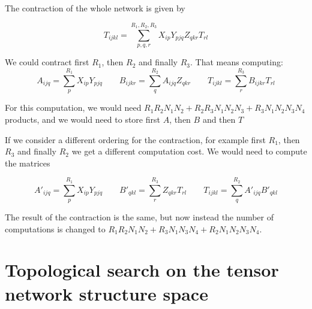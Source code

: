 \documentclass[11pt,a4paper,openright,oneside]{book}
\numberwithin{equation}{section}
\begin{document}
\begin{center}
\end{center}

The contraction of the whole network is given by

$$T_{ijkl} = \sum_{p,q,r}^{R_1, R_2, R_3} X_{ip} Y_{pjq} Z_{qkr} T_{rl}$$

We could contract first $R_1$, then $R_2$ and finally $R_3$. That means computing:
$$A_{ijq} = \sum_{p}^{R_1} X_{ip} Y_{pjq} \qquad B_{ijkr} = \sum_{q}^{R_2} A_{ijq} Z_{qkr} \qquad T_{ijkl} = \sum_{r}^{R_3} B_{ijkr} T_{rl}$$

For this computation, we would need $R_1 R_2 N_1 N_2 + R_2 R_3 N_1 N_2 N_3 + R_3 N_1 N_2 N_3 N_4$ products, and we would need to store
first $A$, then $B$ and then $T$

If we consider a different ordering for the contraction, for example first $R_1$, then $R_3$ and finally $R_2$ we get a different computation cost.
We would need to compute the matrices

$$A'_{ijq} = \sum_{p}^{R_1} X_{ip} Y_{pjq} \qquad B'_{qkl} = \sum_{r}^{R_3} Z_{qkr} T_{rl} \qquad T_{ijkl} = \sum_{q}^{R_2} A'_{ijq} B'_{qkl}$$

The result of the contraction is the same, but now instead the number of computations is
changed to $R_1 R_2 N_1 N_2 + R_3 N_1 N_3 N_4 + R_2 N_1 N_2 N_3 N_4$. 


\chapter{Topological search on the tensor network structure space}
\end{document}
